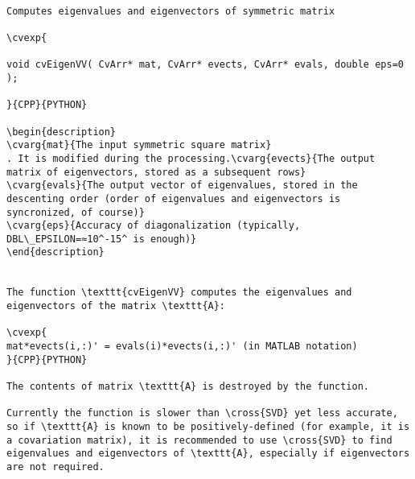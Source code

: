 \begin{verbatim}

Computes eigenvalues and eigenvectors of symmetric matrix

\cvexp{

void cvEigenVV( CvArr* mat, CvArr* evects, CvArr* evals, double eps=0 );

}{CPP}{PYTHON}

\begin{description}
\cvarg{mat}{The input symmetric square matrix}
. It is modified during the processing.\cvarg{evects}{The output matrix of eigenvectors, stored as a subsequent rows}
\cvarg{evals}{The output vector of eigenvalues, stored in the descenting order (order of eigenvalues and eigenvectors is syncronized, of course)}
\cvarg{eps}{Accuracy of diagonalization (typically, DBL\_EPSILON=≈10^-15^ is enough)}
\end{description}


The function \texttt{cvEigenVV} computes the eigenvalues and eigenvectors of the matrix \texttt{A}:

\cvexp{
mat*evects(i,:)' = evals(i)*evects(i,:)' (in MATLAB notation)
}{CPP}{PYTHON}

The contents of matrix \texttt{A} is destroyed by the function.

Currently the function is slower than \cross{SVD} yet less accurate, so if \texttt{A} is known to be positively-defined (for example, it is a covariation matrix), it is recommended to use \cross{SVD} to find eigenvalues and eigenvectors of \texttt{A}, especially if eigenvectors are not required.


\end{verbatim}
